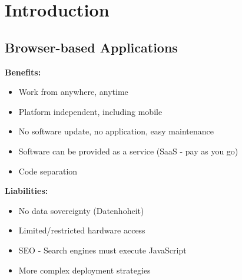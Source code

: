 
\section{Introduction}
\subsection{Browser-based Applications}
\textcolor{b}{\textbf{Benefits:}}
\begin{itemize}[topsep=0pt, leftmargin=3mm]
    \setlength\itemsep{-0.3em}
    \item Work from anywhere, anytime
    \item Platform independent, including mobile
    \item No software update, no application, easy maintenance
    \item Software can be provided as a service (SaaS - pay as you go)
    \item Code separation
\end{itemize}
\textcolor{b}{\textbf{Liabilities:}}
\begin{itemize}[topsep=0pt, leftmargin=3mm]
    \setlength\itemsep{-0.3em}
    \item No data sovereignty (Datenhoheit)
    \item Limited/restricted hardware access
    \item SEO - Search engines must execute JavaScript
    \item More complex deployment strategies
\end{itemize}
